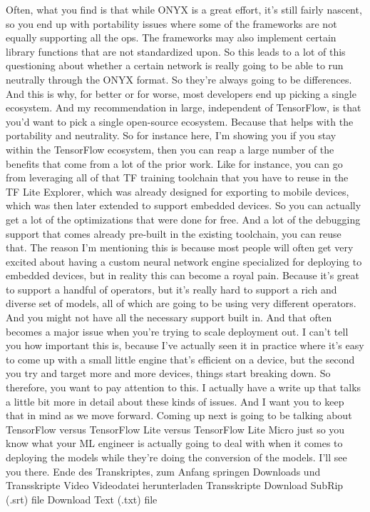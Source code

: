 {{{{{    Often, what you find is that while ONYX is a great effort,
    it's still fairly nascent, so you end up with portability issues
    where some of the frameworks are not equally supporting all the ops.
    The frameworks may also implement certain library functions
    that are not standardized upon.
    So this leads to a lot of this questioning about
    whether a certain network is really going to be able to run neutrally
    through the ONYX format.
    So they're always going to be differences.
    And this is why, for better or for worse,
    most developers end up picking a single ecosystem.
    And my recommendation in large, independent of TensorFlow,
    is that you'd want to pick a single open-source ecosystem.
    Because that helps with the portability and neutrality.
    So for instance here, I'm showing you if you stay within the TensorFlow
    ecosystem, then you can reap a large number of the benefits that
    come from a lot of the prior work.
    Like for instance, you can go from leveraging all of that TF training
    toolchain that you have to reuse in the TF Lite Explorer, which was already
    designed for exporting to mobile devices, which was then later extended
    to support embedded devices.
    So you can actually get a lot of the optimizations that were done for free.
    And a lot of the debugging support that comes already pre-built in the existing
    toolchain, you can reuse that.
    The reason I'm mentioning this is because most people will often
    get very excited about having a custom neural network engine
    specialized for deploying to embedded devices,
    but in reality this can become a royal pain.
    Because it's great to support a handful of operators,
    but it's really hard to support a rich and diverse set of models, all of which
    are going to be using very different operators.
    And you might not have all the necessary support built in.
    And that often becomes a major issue when
    you're trying to scale deployment out.
    I can't tell you how important this is, because I've actually seen it
    in practice where it's easy to come up with a small little engine that's
    efficient on a device, but the second you try
    and target more and more devices, things start breaking down.
    So therefore, you want to pay attention to this.
    I actually have a write up that talks a little bit more in detail
    about these kinds of issues.
    And I want you to keep that in mind as we move forward.
    Coming up next is going to be talking about TensorFlow versus TensorFlow Lite
    versus TensorFlow Lite Micro just so you know what your ML engineer is actually
    going to deal with when it comes to deploying the models while they're
    doing the conversion of the models.
    I'll see you there.
    Ende des Transkriptes, zum Anfang springen
    Downloads und Transskripte
    Video
    Videodatei herunterladen
    Transskripte
    Download SubRip (.srt) file
    Download Text (.txt) file
 
}}}}}
